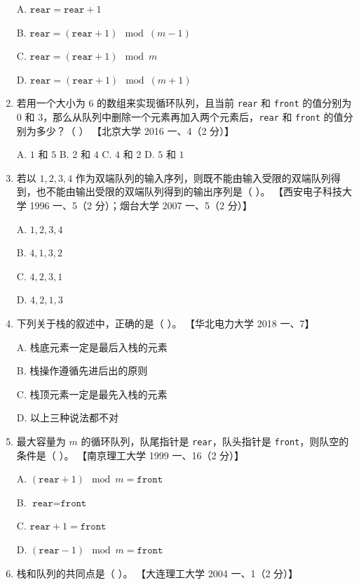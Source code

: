 \documentclass[lang=cn,newtx,10pt,scheme=chinese]{elegantbook}
\begin{document}
\begin{enumerate}
    A. $\texttt{rear} = \texttt{rear} + 1$  

    B. $\texttt{rear} = (\texttt{rear} + 1) \mod (m - 1)$  

    C. $\texttt{rear} = (\texttt{rear} + 1) \mod m$  

    D. $\texttt{rear} = (\texttt{rear} + 1) \mod (m + 1)$  

    \item 若用一个大小为 6 的数组来实现循环队列，且当前 \texttt{rear} 和 \texttt{front} 的值分别为 $0$ 和 $3$，那么从队列中删除一个元素再加入两个元素后，\texttt{rear} 和 \texttt{front} 的值分别为多少？（ ）  
    【北京大学 2016 一、4（2 分）】  

    A. $1$ 和 $5$ \quad B. $2$ 和 $4$ \quad C. $4$ 和 $2$ \quad D. $5$ 和 $1$  

    \item 若以 $1, 2, 3, 4$ 作为双端队列的输入序列，则既不能由输入受限的双端队列得到，也不能由输出受限的双端队列得到的输出序列是（ ）。  
    【西安电子科技大学 1996 一、5（2 分）；烟台大学 2007 一、5（2 分）】  

    A. $1, 2, 3, 4$  

    B. $4, 1, 3, 2$  

    C. $4, 2, 3, 1$  

    D. $4, 2, 1, 3$  

    \item 下列关于栈的叙述中，正确的是（ ）。  
    【华北电力大学 2018 一、7】  

    A. 栈底元素一定是最后入栈的元素  

    B. 栈操作遵循先进后出的原则  

    C. 栈顶元素一定是最先入栈的元素  

    D. 以上三种说法都不对  

    \item 最大容量为 $m$ 的循环队列，队尾指针是 \texttt{rear}，队头指针是 \texttt{front}，则队空的条件是（ ）。  
    【南京理工大学 1999 一、16（2 分）】  

    A. $(\texttt{rear} + 1) \mod m = \texttt{front}$  

    B. $\texttt{rear} = \texttt{front}$  

    C. $\texttt{rear} + 1 = \texttt{front}$  

    D. $(\texttt{rear} - 1) \mod m = \texttt{front}$  

    \item 栈和队列的共同点是（ ）。  
    【大连理工大学 2004 一、1（2 分）】  


\end{enumerate}
\end{document}
